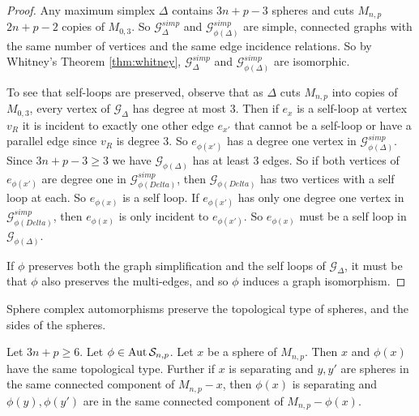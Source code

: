 \begin{proof}
  Any maximum simplex $\Delta$ contains
  $3n+p-3$ spheres and cuts $M_{n,p}$ $2n+p-2$ copies of  $M_{0,3}$.
  So $\mathcal G^{simp}_\Delta$ and $\mathcal G^{simp}_{\phi(\Delta)}$
  are simple, connected graphs with the same number of vertices and the same edge incidence relations.
  So by Whitney's Theorem  \ref{thm:whitney},
  $\mathcal G^{simp}_\Delta$ and $\mathcal G^{simp}_{\phi(\Delta)}$
  are isomorphic.

  To see that self-loops are preserved,
  observe that as $\Delta$ cuts $M_{n,p}$ into copies of $M_{0,3}$,
  every vertex of $\mathcal G_\Delta$ has degree at most 3.
  Then if $e_x$ is a self-loop at vertex $v_R$ it is incident to exactly one other edge $e_{x'}$ that cannot be a self-loop or have a parallel edge since $v_R$ is degree 3.
  So $e_{\phi(x')}$ has a degree one vertex in $\mathcal G^{simp}_{\phi(\Delta)}$.
  Since $3n+p-3\geq 3$ we have $\mathcal G_{\phi(\Delta)}$
  has at least 3 edges.
  So if both vertices of $e_{\phi(x')}$
  are degree one in $\mathcal G^{simp}_{\phi(Delta)}$, then $\mathcal G_{\phi(Delta)}$
  has two vertices with a self loop at each.
  So $e_{\phi(x)}$ is a self loop.
  If $e_{\phi(x')}$ has only one degree one vertex in $\mathcal G^{simp}_{\phi(Delta)}$, then $e_{\phi(x)}$ is only incident to $e_{\phi(x')}$. So $e_{\phi(x)}$ must be a self loop in  $\mathcal G_{\phi(\Delta)}$.

  If $\phi$ preserves both the graph simplification and the self loops of $\mathcal G_\Delta$, it must be that $\phi$ also preserves the multi-edges, and so $\phi$ induces a graph isomorphism.
\end{proof}

\begin{lemma}
  Sphere complex automorphisms preserve the topological type of spheres, and the sides of the spheres.

  Let $3n+p\geq 6$.
  Let $\phi \in \operatorname{Aut} \mathcal S_{n,p}$.
  Let $x$ be a sphere of $M_{n,p}$.
  Then $x$ and $\phi(x)$ have the same topological type.
  Further if $x$ is separating and $y,y'$ are spheres in the same connected component of $M_{n,p}-x$, then $\phi(x)$ is separating and $\phi(y),\phi(y')$ are
  in the same connected component of $M_{n,p}-\phi(x)$.
  \label{lemma:outspheretype}
\end{lemma}

